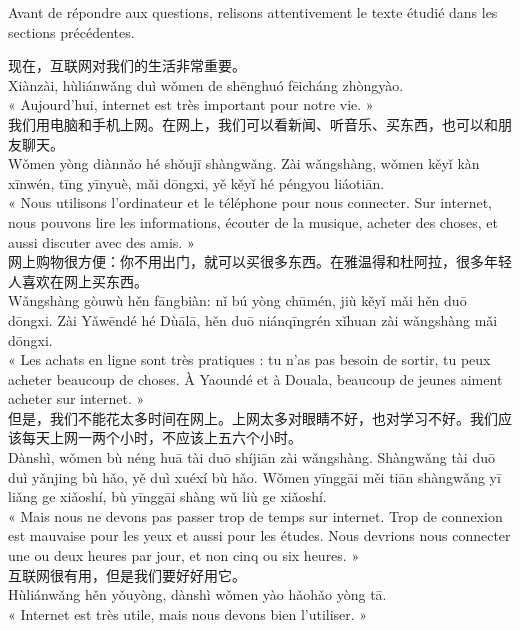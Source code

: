 \documentclass[11pt]{article}
\newcounter{popsec}
\newcounter{popsub}
\newcommand{\courssub}[1]{%
  \stepcounter{popsub}%
  \par\vspace{9pt}\noindent{\popxbold\fontsize{11.5}{13}\selectfont\color{popink}{\color{poporange}\thepopsec.\thepopsub}\hspace{6pt}#1}\par\nopagebreak\vspace{4pt}
}
\begin{document}
\courssub{Rappel du texte support}

Avant de répondre aux questions, relisons attentivement le texte étudié dans les sections précédentes.

\begin{textebox}
现在，互联网对我们的生活非常重要。\\
Xiànzài, hùliánwǎng duì wǒmen de shēnghuó fēicháng zhòngyào.\\
« Aujourd'hui, internet est très important pour notre vie. »\\[4pt]
我们用电脑和手机上网。在网上，我们可以看新闻、听音乐、买东西，也可以和朋友聊天。\\
Wǒmen yòng diànnǎo hé shǒujī shàngwǎng. Zài wǎngshàng, wǒmen kěyǐ kàn xīnwén, tīng yīnyuè, mǎi dōngxi, yě kěyǐ hé péngyou liáotiān.\\
« Nous utilisons l'ordinateur et le téléphone pour nous connecter. Sur internet, nous pouvons lire les informations, écouter de la musique, acheter des choses, et aussi discuter avec des amis. »\\[4pt]
网上购物很方便：你不用出门，就可以买很多东西。在雅温得和杜阿拉，很多年轻人喜欢在网上买东西。\\
Wǎngshàng gòuwù hěn fāngbiàn: nǐ bú yòng chūmén, jiù kěyǐ mǎi hěn duō dōngxi. Zài Yǎwēndé hé Dùālā, hěn duō niánqīngrén xǐhuan zài wǎngshàng mǎi dōngxi.\\
« Les achats en ligne sont très pratiques : tu n'as pas besoin de sortir, tu peux acheter beaucoup de choses. À Yaoundé et à Douala, beaucoup de jeunes aiment acheter sur internet. »\\[4pt]
但是，我们不能花太多时间在网上。上网太多对眼睛不好，也对学习不好。我们应该每天上网一两个小时，不应该上五六个小时。\\
Dànshì, wǒmen bù néng huā tài duō shíjiān zài wǎngshàng. Shàngwǎng tài duō duì yǎnjing bù hǎo, yě duì xuéxí bù hǎo. Wǒmen yīnggāi měi tiān shàngwǎng yī liǎng ge xiǎoshí, bù yīnggāi shàng wǔ liù ge xiǎoshí.\\
« Mais nous ne devons pas passer trop de temps sur internet. Trop de connexion est mauvaise pour les yeux et aussi pour les études. Nous devrions nous connecter une ou deux heures par jour, et non cinq ou six heures. »\\[4pt]
互联网很有用，但是我们要好好用它。\\
Hùliánwǎng hěn yǒuyòng, dànshì wǒmen yào hǎohǎo yòng tā.\\
« Internet est très utile, mais nous devons bien l'utiliser. »
\end{textebox}
\end{document}
